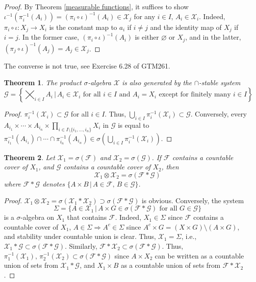 \documentclass[11pt, a4paper, openany]{book}
\newtheorem{thm}{Theorem}\newtheorem{lem}{Lemma}\newtheorem{crl}{Corollary}
\theoremstyle{definition}
\begin{document}
    \begin{proof}
        By Theorem \ref{measurable functions}, it suffices to show $\iota^{-1}(\pi_i^{-1}(A_i))=(\pi_i\circ \iota)^{-1}(A_i)\in\mathscr{X}_j$ for any $i\in I$, $A_i\in\mathscr{X}_i$. Indeed, $\pi_i\circ \iota:X_j\rightarrow X_i$ is the constant map to $a_i$ if $i\neq j$ and the identity map of $X_j$ if $i=j$. In the former case, $(\pi_i\circ \iota)^{-1}(A_i)$ is either $\varnothing$ or $X_j$, and in the latter, $(\pi_j\circ \iota)^{-1}(A_j)=A_j\in\mathscr{X}_j$.
    \end{proof}
    The converse is not true, see Exercise 6.28 of GTM261.
    \begin{thm}\label{generator of arbitrary product sigma algebra}
        The product $\sigma$-algebra $\mathscr{X}$ is also generated by the $\cap$-stable system
        \[
            \mathscr{G}=\left\{\bigtimes_{i\in I}A_i\,\bigg|\,A_i\in\mathscr{X}_i\text{ for all }i\in I\text{ and }A_i=X_i\text{ except for finitely many }i\in I\right\}
        \]
    \end{thm}
    \begin{proof}
        $\pi_{i}^{-1}(\mathscr{X}_i)\subset\mathscr{G}$ for all $i\in I$. Thus, $\bigcup_{i\in I}\pi_{i}^{-1}(\mathscr{X}_i)\subset\mathscr{G}$.
        Conversely, every $A_{i_1}\times\cdots\times A_{i_n}\times\prod_{i\in I\setminus\{i_1,\dots,i_n\}}X_i$ in $\mathscr{G}$ is equal to $\pi_{i_1}^{-1}(A_{i_1})\cap \cdots\cap\pi_{i_n}^{-1}(A_{i_n})\in\sigma \left(\bigcup_{i\in I}\pi_{i}^{-1}(\mathscr{X}_i)\right)$.
    \end{proof}
    \begin{thm}\label{Product of Generator is Generator of Product Sigma Algebra}
        Let $\mathscr{X}_1=\sigma(\mathscr{F})$ and $\mathscr{X}_2=\sigma(\mathscr{G})$. If $\mathscr{F}$ contains a countable cover of $X_1$, and $\mathscr{G}$ contains a countable cover of $X_2$, then
         \[\mathscr{X}_1\otimes \mathscr{X}_2=\sigma(\mathscr{F}* \mathscr{G})\]
         where $\mathscr{F}* \mathscr{G}$ denotes $\{A\times B\,|\,A\in\mathscr{F},\,B\in\mathscr{G}\}$.
     \end{thm}
     \begin{proof}
         $\mathscr{X}_1\otimes \mathscr{X}_2=\sigma(\mathscr{X}_1*\mathscr{X}_2)\supset\sigma(\mathscr{F}* \mathscr{G})$ is obvious. Conversely, the system
         \[
         \Sigma=\{A\in\mathscr{X}_1\,|\,A\times G\in \sigma(\mathscr{F}* \mathscr{G})\text{ for all }G\in\mathscr{G}\}
         \]
         is a $\sigma$-algebra on $X_1$ that contains $\mathscr{F}$. Indeed, $X_1\in\Sigma$ since $\mathscr{F}$ contains a countable cover of $X_1$, $A\in\Sigma\Longrightarrow A^c\in\Sigma$ since $A^c\times G=(X\times G)\setminus(A\times G)$, and stability under countable union is clear. Thus, $\mathscr{X}_1=\Sigma$, i.e., $\mathscr{X}_1* \mathscr{G}\subset \sigma(\mathscr{F}* \mathscr{G})$.  Similarly, $\mathscr{F}* \mathscr{X}_2\subset \sigma(\mathscr{F}* \mathscr{G})$. Thus, $\pi_1^{-1}(\mathscr{X}_1),\,\pi_2^{-1}(\mathscr{X}_2)\subset \sigma(\mathscr{F}* \mathscr{G})$ since $A\times X_2$ can be written as a countable union of sets from $\mathscr{X}_1*\mathscr{G}$, and $X_1\times B$ as a countable union of sets from $\mathscr{F}*\mathscr{X}_2$.
     \end{proof}
\end{document}
